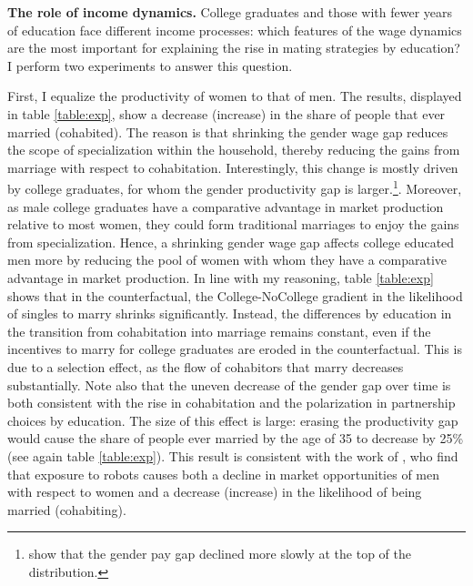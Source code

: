 \documentclass[12pt]{article}
\begin{document}
\textbf{The role of income dynamics.} College graduates and those with fewer years of education face different income processes: which features of the wage dynamics are the most important for explaining the rise in mating strategies by education? I perform two experiments to answer this question.

 First, I equalize the productivity of women to that of men. The results, displayed in table \ref{table:exp}, show a decrease (increase) in the share of people that ever married (cohabited). The reason is that shrinking the gender wage gap reduces the scope of specialization within the household, thereby reducing the gains from marriage with respect to cohabitation. Interestingly, this change is mostly driven by college graduates, for whom the gender productivity gap is larger.\footnote{\cite{cortes2019} show that the gender pay gap declined more slowly at the top of the distribution.}. Moreover, as male college graduates have a comparative advantage in market production relative to most women, they could form traditional marriages to enjoy the gains from specialization. Hence, a shrinking gender wage gap affects college educated men more by reducing the pool of women with whom they have a comparative advantage in market production. In line with my reasoning, table \ref{table:exp} shows that in the counterfactual, the College-NoCollege gradient in the likelihood of singles to marry shrinks significantly. Instead, the differences by education in the transition from cohabitation into marriage remains constant, even if the incentives to marry for college graduates are eroded in the counterfactual. This is due to a selection effect, as the flow of cohabitors that marry decreases substantially. Note also that the uneven decrease of the gender gap over time is both consistent with the rise in cohabitation and the polarization in partnership choices by education. The size of this effect is large: erasing the productivity gap would cause the share of people ever married by the age of 35 to decrease  by 25\% (see again table \ref{table:exp}). This result is consistent with the work of \cite{anelli2019}, who find that exposure to robots causes both a decline in market opportunities of men with respect to women and a decrease (increase) in the likelihood of being married (cohabiting).
\end{document}
